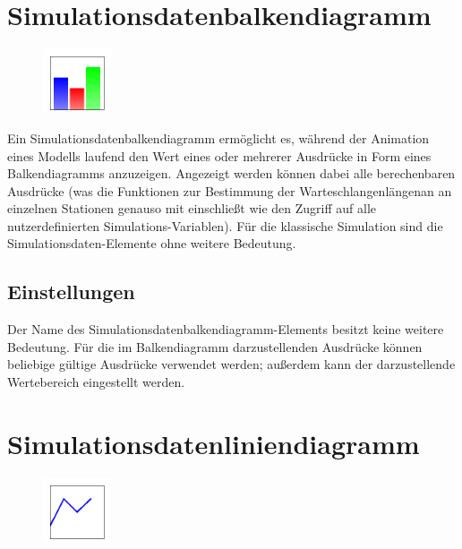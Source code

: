 \section{Simulationsdatenbalkendiagramm}
\label{ref:ModelElementAnimationBarChart}

\begin{figure}
\vspace{-22pt}
\includegraphics[width=2cm]{imageModelElementAnimationBarChart.png}
\vspace{-22pt}
\end{figure}

Ein Simulationsdatenbalkendiagramm ermöglicht es, während der Animation eines Modells laufend den Wert
eines oder mehrerer Ausdrücke in Form eines Balkendiagramms anzuzeigen.
Angezeigt werden können dabei alle berechenbaren Ausdrücke (was die Funktionen zur Bestimmung der
Warteschlangenlängenan an einzelnen Stationen genauso mit einschließt wie den Zugriff auf alle
nutzerdefinierten Simulations-Variablen). Für die klassische Simulation sind die
Simulationsdaten-Elemente ohne weitere Bedeutung.

\subsection*{Einstellungen}

Der Name des Simulationsdatenbalkendiagramm-Elements besitzt keine weitere Bedeutung. Für die im
Balkendiagramm darzustellenden Ausdrücke können beliebige gültige Ausdrücke verwendet werden;
außerdem kann der darzustellende Wertebereich eingestellt werden.


\section{Simulationsdatenliniendiagramm}
\label{ref:ModelElementAnimationDiagram}

\begin{figure}
\vspace{-22pt}
\includegraphics[width=2cm]{imageModelElementAnimationDiagram.png}
\vspace{-22pt}
\end{figure}

